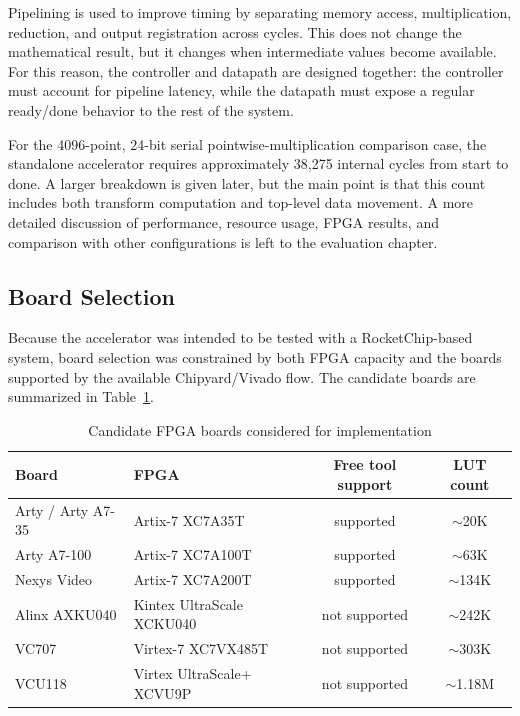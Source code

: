 \documentclass[a4paper, 12pt, titlepage]{article}
\begin{document}
Pipelining is used to improve timing by separating memory access, multiplication,
reduction, and output registration across cycles. This does not change the
mathematical result, but it changes when intermediate values become available.
For this reason, the controller and datapath are designed together: the
controller must account for pipeline latency, while the datapath must expose a
regular ready/done behavior to the rest of the system.

For the 4096-point, 24-bit serial pointwise-multiplication comparison case, the
standalone accelerator requires approximately 38,275 internal cycles from start
to done. A larger breakdown is given later, but the main point is that this
count includes both transform computation and top-level data movement. A more
detailed discussion of performance, resource usage, FPGA results, and comparison
with other configurations is left to the evaluation chapter.

\subsection{Board Selection}

Because the accelerator was intended to be tested with a RocketChip-based
system, board selection was constrained by both FPGA capacity and the boards
supported by the available Chipyard/Vivado flow. The candidate boards are
summarized in Table~\ref{tab:board-selection}.

\begin{table}[H]
\centering
\caption{Candidate FPGA boards considered for implementation}
\label{tab:board-selection}
\begin{tabular}{|l|l|c|c|}
\hline
\textbf{Board} & \textbf{FPGA} & \textbf{Free tool support} & \textbf{LUT count} \\
\hline
Arty / Arty A7-35 & Artix-7 XC7A35T & supported & \(\sim\)20K \\
\hline
Arty A7-100 & Artix-7 XC7A100T & supported & \(\sim\)63K \\
\hline
Nexys Video & Artix-7 XC7A200T & supported & \(\sim\)134K \\
\hline
Alinx AXKU040 & Kintex UltraScale XCKU040 & not supported & \(\sim\)242K \\
\hline
VC707 & Virtex-7 XC7VX485T & not supported & \(\sim\)303K \\
\hline
VCU118 & Virtex UltraScale+ XCVU9P & not supported & \(\sim\)1.18M \\
\hline
\end{tabular}
\end{table}
\end{document}
